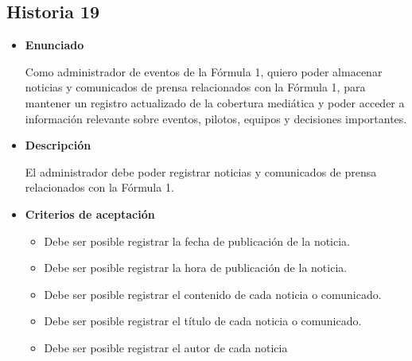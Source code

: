 \documentclass{article}
\begin{document}
	\subsection{Historia 19}
	\begin{itemize}
		
		\item \large{\textbf{Enunciado}}
		\begin{description}
		Como administrador de eventos de la Fórmula 1, quiero poder almacenar noticias y comunicados de prensa relacionados con la Fórmula 1, para mantener un registro actualizado de la cobertura mediática y poder acceder a información relevante sobre eventos, pilotos, equipos y decisiones importantes.

		\end{description}
		
		\item \large{\textbf{Descripción}}
		\begin{description}
El administrador debe poder registrar noticias y comunicados de prensa relacionados con la Fórmula 1. 

		\end{description}
		
		\item \large{\textbf{Criterios de aceptación}}
		\begin{itemize}
			\item Debe ser posible registrar la fecha de publicación de la noticia.
			\item Debe ser posible registrar la hora de publicación de la noticia.
			\item Debe ser posible registrar el contenido de cada noticia o comunicado.
			\item Debe ser posible registrar el título de cada noticia o comunicado. 
			\item Debe ser posible registrar el autor de cada noticia
			
		\end{itemize}
		
	\end{itemize}
	
\end{document}
